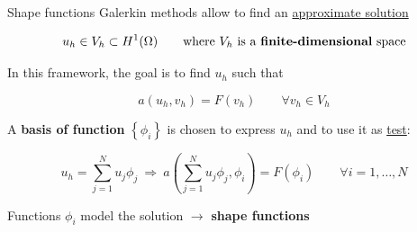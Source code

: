 \documentclass[10pt,externalviewer]{beamer}
\begin{document}
\begin{frame}{Shape functions}
   Galerkin methods allow to find an \underline{approximate solution}
   
   \begin{equation*}
      u_h\in V_h\subset H^1(\Omega) \qquad \text{where } V_h \ \text{is a \textbf{finite-dimensional} space} 
   \end{equation*}

   In this framework, the goal is to find $u_h$ such that

   \begin{equation*}
      \boxed{a\left(u_h,v_h\right)=F\left(v_h\right) \qquad \forall v_h\in V_h}
   \end{equation*}

   \vfill

   \pause

   A \textbf{basis of function} $\left\{\phi_i\right\}$ is chosen to express $u_h$ and to use it as \underline{test}:

   \begin{equation*}
      u_h=\sum_{j=1}^Nu_j\phi_j \ \Longrightarrow \ a\left(\sum_{j=1}^Nu_j\phi_j,\phi_i\right)=F\left(\phi_i\right) \qquad \forall i=1,\dots,N
   \end{equation*}

   \vfill

   \pause

   \begin{center}
      Functions $\phi_i$ model the solution $\longrightarrow$ \textbf{\textcolor{BrickRed}{shape functions}}
   \end{center}
\end{frame}
\end{document}

